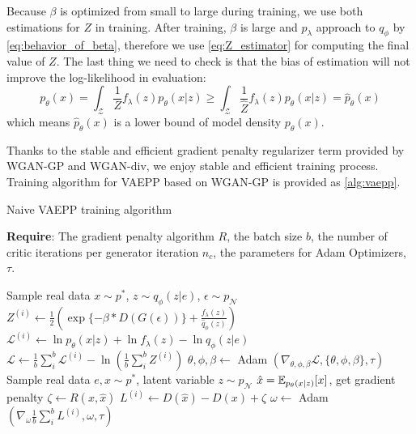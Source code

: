 Because $\beta$ is optimized from small to large during training, we use both estimations for $Z$ in training. After training, $\beta$ is large and $p_\lambda$ approach to $q_\phi$ by \cref{eq:behavior_of_beta}, therefore we use \cref{eq:Z_estimator} for computing the final value of $Z$. The last thing we need to check is that the bias of estimation will not improve the log-likelihood in evaluation:
\begin{equation*}
	p_\theta(x) = \int_{\mathcal{Z}} \frac{1}{Z} f_\lambda(z) p_\theta(x|z) \geq \int_{\mathcal{Z}} \frac{1}{\hat{Z}} f_\lambda(z) p_\theta(x|z) = \hat{p}_\theta(x)
\end{equation*}
which means $\hat{p}_\theta(x)$ is a lower bound of model density $p_\theta(x)$. 

Thanks to the stable and efficient gradient penalty regularizer term provided by WGAN-GP and WGAN-div, we enjoy stable and efficient training process. Training algorithm for VAEPP based on WGAN-GP is provided as \cref{alg:vaepp}. 
\begin{algorithm}[tb]
\caption{Naive VAEPP training algorithm}
\label{alg:vaepp}
\textbf{Require}: The gradient penalty algorithm $R$, the batch size $b$, the number of critic iterations per generator iteration $n_c$, the parameters for Adam Optimizers, $\tau$. 

\begin{algorithmic}[1] %
\STATE Sample real data $x \sim p^*$, $z \sim q_\phi(z|e)$, $\epsilon \sim p_\mathcal{N}$
\STATE $Z^{(i)} \gets \frac{1}{2}(\exp\{-\beta * D(G(\epsilon))\} + \frac{f_\lambda(z)}{\hat{q}_\phi(z)})$
\STATE $\mathcal{L}^{(i)} \gets \ln p_\theta(x|z) + \ln f_\lambda(z) - \ln q_\phi(z|e)$
\ENDFOR
\STATE $\mathcal{L} \gets \frac{1}{b}\sum_{i}^b \mathcal{L}^{(i)} - \ln (\frac{1}{b}\sum_{i}^b Z^{(i)})$
\STATE $\theta, \phi, \beta \gets $ Adam $(\nabla_{\theta, \phi, \beta} \mathcal{L}, \{\theta, \phi, \beta\}, \tau)$
\ENDFOR
{}
\STATE Sample real data $e, x \sim p^*$, latent variable $z \sim p_\mathcal{N}$
\STATE	$\hat{x} = \operatorname{\mathbb{E}}_{p_\theta(x|z)}[x]$, get gradient penalty $\zeta \gets R(x, \hat{x})$
\STATE $L^{(i)} \gets D(\hat{x}) - D(x) + \zeta$
\ENDFOR
\STATE $\omega \gets $ Adam $(\nabla_{\omega} \frac{1}{b}\sum_{i}^b L^{(i)}, \omega, \tau)$
\ENDWHILE
\end{algorithmic}
\end{algorithm}
